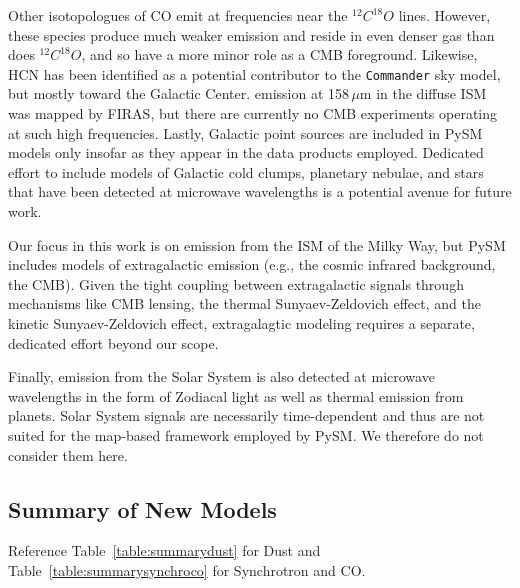 \documentclass[twocolumn]{aastex631}
\begin{document}
Other isotopologues of CO emit at frequencies near the $^{12}C^{18}O$ lines. However, these species produce much weaker emission and reside in even denser gas than does $^{12}C^{18}O$, and so have a more minor role as a CMB foreground. Likewise, HCN has been identified as a potential contributor to the \texttt{Commander} sky model, but mostly toward the Galactic Center.  emission at 158\,$\mu$m in the diffuse ISM was mapped by FIRAS, but there are currently no CMB experiments operating at such high frequencies. Lastly, Galactic point sources are included in PySM models only insofar as they appear in the data products employed. Dedicated effort to include models of Galactic cold clumps, planetary nebulae, and stars that have been detected at microwave wavelengths is a potential avenue for future work. 

Our focus in this work is on emission from the ISM of the Milky Way, but PySM includes models of extragalactic emission (e.g., the cosmic infrared background, the CMB). Given the tight coupling between extragalactic signals through mechanisms like CMB lensing, the thermal Sunyaev-Zeldovich effect, and the kinetic Sunyaev-Zeldovich effect, extragalagtic modeling requires a separate, dedicated effort beyond our scope.

Finally, emission from the Solar System is also detected at microwave wavelengths in the form of Zodiacal light as well as thermal emission from planets. Solar System signals are necessarily time-dependent and thus are not suited for the map-based framework employed by PySM. We therefore do not consider them here.

\subsection{Summary of New Models}

Reference Table~\ref{table:summarydust} for Dust and Table~\ref{table:summarysynchroco} for Synchrotron and CO.
\end{document}
